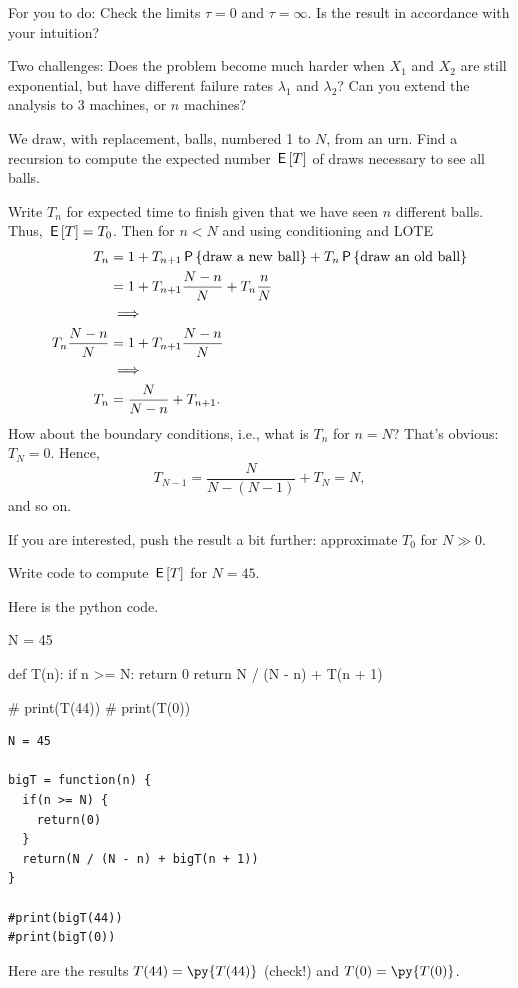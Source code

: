 \documentclass[lectures]{subfiles}
\begin{document}
\begin{exercise}
\begin{solution}
For you to do: Check the limits $\tau=0$ and $\tau=\infty$. Is the result in accordance with your intuition?

Two challenges: Does the problem become much harder when $X_{1}$ and $X_{2}$ are still exponential, but have different failure rates $\lambda_1$ and $\lambda_{2}$? Can you extend the analysis to 3 machines, or $n$ machines?

\end{solution}
\end{exercise}

\begin{exercise}
We draw, with replacement, balls, numbered 1 to $N$, from an urn.
Find a recursion to compute the expected number $\E T$ of draws necessary to see all balls.
\begin{solution}
Write $T_{n}$ for expected time to finish given that we have seen $n$ different balls. Thus, $\E T = T_{0}$.
Then for $n< N$ and using conditioning and LOTE
\begin{align}
\label{eq:28}
T_n
&= 1
+T_{n+1} \P{\text{draw a new ball}}
+T_{n} \P{\text{draw an old ball}}  \\
&= 1
+T_{n+1} \frac{N-n}{N}
+T_{n} \frac{n}{N} \\
&\implies\\
T_n \frac{N-n}{N} &= 1 +T_{n+1} \frac{N-n}{N} \\
&\implies \\
T_n &= \frac{N}{N-n}  +T_{n+1}.
\end{align}
How about the boundary conditions, i.e., what is $T_{n}$ for $n=N$?
That's obvious: $T_{N} = 0$. Hence,
\begin{equation}
\label{eq:28}
T_{N-1} = \frac{N}{N-(N-1)} + T_{N} = N,
\end{equation}
and so on.

If you are interested,  push the result a bit further: approximate $T_{0}$ for $N\gg 0$.
\end{solution}
\end{exercise}


\begin{exercise}
Write code to compute $\E T$ for $N=45$.
\begin{solution}
Here is the python code.

\begin{pyblock}
N = 45


def T(n):
    if n >= N:
        return 0
    return N / (N - n) + T(n + 1)

# print(T(44))
# print(T(0))
\end{pyblock}
\begin{verbatim}
N = 45

bigT = function(n) {
  if(n >= N) {
    return(0)
  }
  return(N / (N - n) + bigT(n + 1))
}

#print(bigT(44))
#print(bigT(0))
\end{verbatim}
Here are the results $T(44) = \py{T(44)}$ (check!) and $T(0) = \py{T(0)}$.
\end{solution}
\end{exercise}
\end{document}
